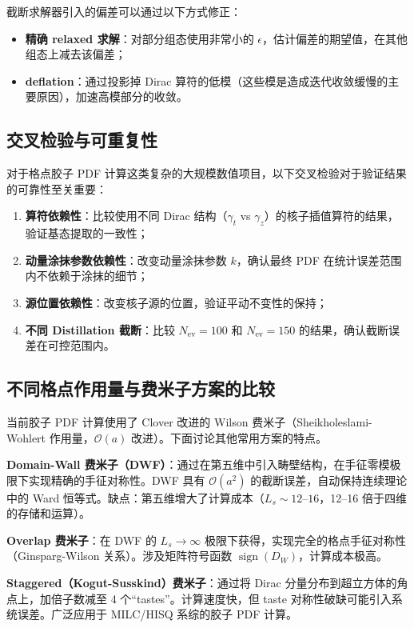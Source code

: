 \documentclass[11pt,a4paper]{ctexart}
\newcommand{\order}[1]{\mathcal{O}(#1)}
\begin{document}
截断求解器引入的偏差可以通过以下方式修正：
\begin{itemize}
  \item \textbf{精确 relaxed 求解}：对部分组态使用非常小的 $\epsilon$，估计偏差的期望值，在其他组态上减去该偏差；
  \item \textbf{deflation}：通过投影掉 Dirac 算符的低模（这些模是造成迭代收敛缓慢的主要原因），加速高模部分的收敛。
\end{itemize}

\subsection{交叉检验与可重复性}

对于格点胶子 PDF 计算这类复杂的大规模数值项目，以下交叉检验对于验证结果的可靠性至关重要：

\begin{enumerate}
  \item \textbf{算符依赖性}：比较使用不同 Dirac 结构（$\gamma_t$ vs $\gamma_z$）的核子插值算符的结果，验证基态提取的一致性；
  \item \textbf{动量涂抹参数依赖性}：改变动量涂抹参数 $k$，确认最终 PDF 在统计误差范围内不依赖于涂抹的细节；
  \item \textbf{源位置依赖性}：改变核子源的位置，验证平动不变性的保持；
\item \textbf{不同 Distillation 截断}：比较 $N_{\text{ev}} = 100$ 和 $N_{\text{ev}} = 150$ 的结果，确认截断误差在可控范围内。
\end{enumerate}

\subsection{不同格点作用量与费米子方案的比较}

当前胶子 PDF 计算使用了 Clover 改进的 Wilson 费米子（Sheikholeslami-Wohlert 作用量，$\order{a}$ 改进）。下面讨论其他常用方案的特点。

\textbf{Domain-Wall 费米子（DWF）}：通过在第五维中引入畴壁结构，在手征零模极限下实现精确的手征对称性。DWF 具有 $\order{a^2}$ 的截断误差，自动保持连续理论中的 Ward 恒等式。缺点：第五维增大了计算成本（$L_s \sim 12\text{--}16$，12--16 倍于四维的存储和运算）。

\textbf{Overlap 费米子}：在 DWF 的 $L_s \to \infty$ 极限下获得，实现完全的格点手征对称性（Ginsparg-Wilson 关系）。涉及矩阵符号函数 $\operatorname{sign}(D_W)$，计算成本极高。

\textbf{Staggered（Kogut-Susskind）费米子}：通过将 Dirac 分量分布到超立方体的角点上，加倍子数减至 4 个``tastes''。计算速度快，但 taste 对称性破缺可能引入系统误差。广泛应用于 MILC/HISQ 系综的胶子 PDF 计算。
\end{document}
